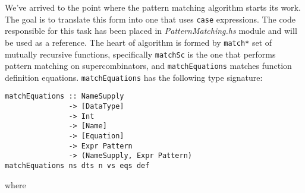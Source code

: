 \documentclass[12pt,a4paper]{report}
\begin{document}
We've arrived to the point where the pattern matching algorithm starts its
work. The goal is to translate this form into one that uses \texttt{case}
expressions. The code responsible for this task has been placed in
\textit{PatternMatching.hs} module and will be used as a reference. The heart
of algorithm is formed by \texttt{match*} set of mutually recursive functions,
specifically \texttt{matchSc} is the one that performs pattern matching on
supercombinators, and \texttt{matchEquations} matches function definition
equations. \texttt{matchEquations} has the following type signature:

\hspace*{-1.5in}
\begin{lstlisting}[style=haskell]
matchEquations :: NameSupply
               -> [DataType]
               -> Int
               -> [Name]
               -> [Equation]
               -> Expr Pattern
               -> (NameSupply, Expr Pattern)
matchEquations ns dts n vs eqs def
\end{lstlisting}
where
\end{document}
